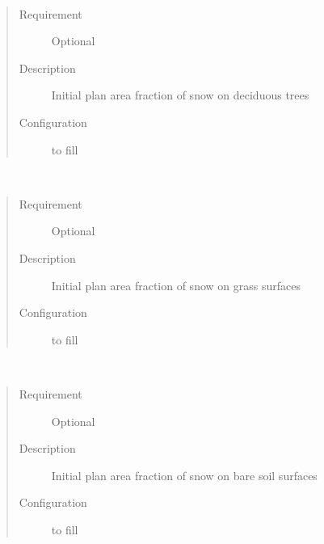 \documentclass[letterpaper,10pt,english]{sphinxmanual}
\begin{document}
\begin{fulllineitems}
\label{\detokenize{input_files/Initial_Conditions/Snow_related_parameters:cmdoption-arg-snowfracdectr}}~\begin{quote}\begin{description}
\item[{Requirement}] \leavevmode
Optional

\item[{Description}] \leavevmode
Initial plan area fraction of snow on deciduous trees

\item[{Configuration}] \leavevmode
to fill

\end{description}\end{quote}

\end{fulllineitems}


\begin{fulllineitems}
\label{\detokenize{input_files/Initial_Conditions/Snow_related_parameters:cmdoption-arg-snowfracgras}}~\begin{quote}\begin{description}
\item[{Requirement}] \leavevmode
Optional

\item[{Description}] \leavevmode
Initial plan area fraction of snow on grass surfaces

\item[{Configuration}] \leavevmode
to fill

\end{description}\end{quote}

\end{fulllineitems}


\begin{fulllineitems}
\label{\detokenize{input_files/Initial_Conditions/Snow_related_parameters:cmdoption-arg-snowfracbsoil}}~\begin{quote}\begin{description}
\item[{Requirement}] \leavevmode
Optional

\item[{Description}] \leavevmode
Initial plan area fraction of snow on bare soil surfaces

\item[{Configuration}] \leavevmode
to fill

\end{description}\end{quote}

\end{fulllineitems}
\end{document}
